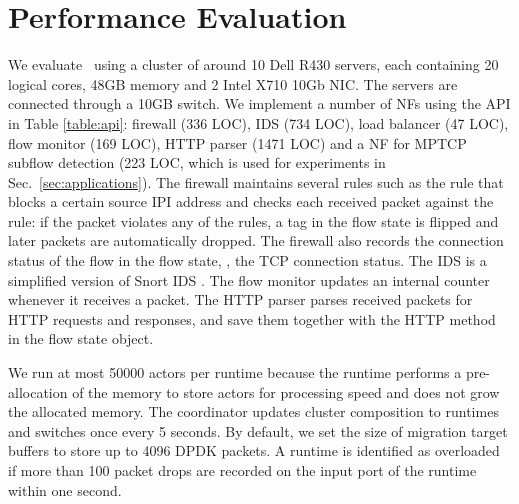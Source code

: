 \section{Performance Evaluation}
\label{sec:experiments}


We evaluate \nfactor~using a cluster of around 10 Dell R430 servers, each containing 20 logical cores, 48GB memory and 2 Intel X710 10Gb NIC. The servers are connected through a 10GB switch. We implement a number of NFs using the API in Table \ref{table:api}: %
firewall (336 LOC), IDS (734 LOC), load balancer (47 LOC), flow monitor (169 LOC), HTTP parser (1471 LOC) and a NF for MPTCP subflow detection (223 LOC, which is used for experiments in Sec.~\ref{sec:applications}). %
The firewall maintains several rules such as the rule that blocks a certain source IPI address %
and checks each received packet against the rule: if the packet violates any of the rules, a tag in the flow state is flipped and later packets are automatically dropped. The firewall also records the connection status of the flow in the flow state, \ie, the TCP connection status.
The IDS is a simplified version of Snort IDS \cite{snort}.%
The flow monitor updates an internal counter whenever it receives a packet. The HTTP parser parses received packets for HTTP requests and responses, and save them together with the HTTP method in the flow state object.%

We run at most 50000 actors per runtime because the runtime performs a pre-allocation of the memory to store actors for processing speed and does not grow the allocated memory. %
The coordinator updates cluster composition to runtimes and switches once every 5 seconds. %
By default, we set the size of migration target buffers to store up to 4096 DPDK packets.%
A runtime is identified as overloaded if more than 100 packet drops are recorded on the input port of the runtime within one second.

